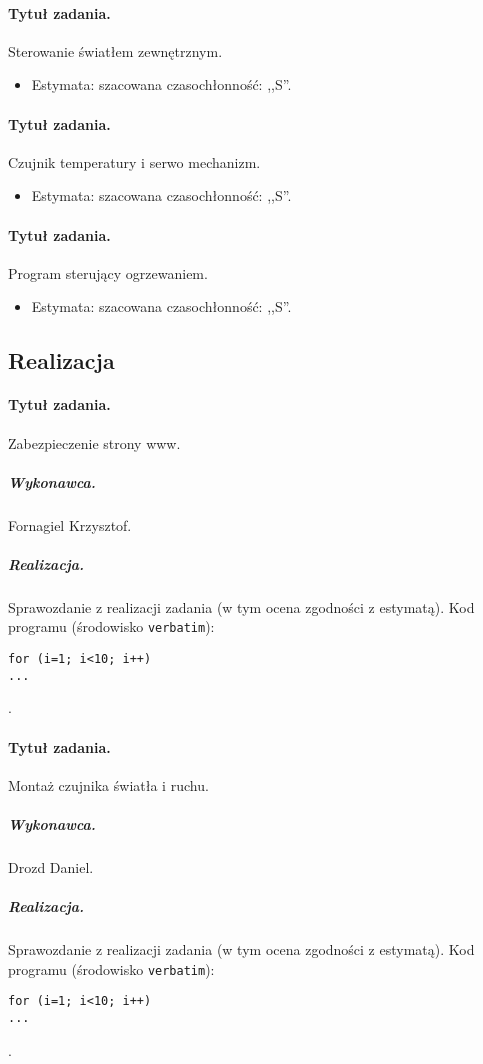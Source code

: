 \paragraph{Tytuł zadania.} Sterowanie światłem zewnętrznym.
\begin{itemize}
	\item Estymata: szacowana czasochłonność: ,,S''.
\end{itemize}

\paragraph{Tytuł zadania.} Czujnik temperatury i serwo mechanizm.
\begin{itemize}
	\item Estymata: szacowana czasochłonność: ,,S''.
\end{itemize}

\paragraph{Tytuł zadania.} Program sterujący ogrzewaniem.
\begin{itemize}
	\item Estymata: szacowana czasochłonność: ,,S''.
\end{itemize}


\subsection{Realizacja}

\paragraph{Tytuł zadania.} Zabezpieczenie strony www.
\subparagraph{Wykonawca.} Fornagiel Krzysztof.
\subparagraph{Realizacja.} Sprawozdanie z realizacji zadania (w tym ocena zgodności z estymatą). Kod programu (środowisko \texttt{verbatim}): \begin{verbatim}
for (i=1; i<10; i++)
...
\end{verbatim}.

\paragraph{Tytuł zadania.} Montaż czujnika światła i ruchu.
\subparagraph{Wykonawca.} Drozd Daniel.
\subparagraph{Realizacja.} Sprawozdanie z realizacji zadania (w tym ocena zgodności z estymatą). Kod programu (środowisko \texttt{verbatim}): \begin{verbatim}
for (i=1; i<10; i++)
...
\end{verbatim}.

